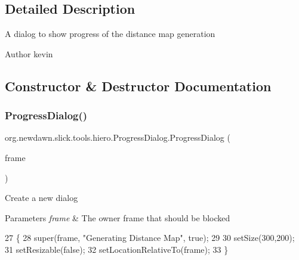\subsection{Detailed Description}
A dialog to show progress of the distance map generation

\begin{DoxyAuthor}{Author}
kevin 
\end{DoxyAuthor}


\subsection{Constructor \& Destructor Documentation}
\mbox{\label{classorg_1_1newdawn_1_1slick_1_1tools_1_1hiero_1_1_progress_dialog_a682daff052b72afb47eeb3daae24aaa6}} 
\subsubsection{\texorpdfstring{Progress\+Dialog()}{ProgressDialog()}}
{\footnotesize\ttfamily org.\+newdawn.\+slick.\+tools.\+hiero.\+Progress\+Dialog.\+Progress\+Dialog (\begin{DoxyParamCaption}\item[{J\+Frame}]{frame }\end{DoxyParamCaption})\hspace{0.3cm}{\ttfamily [inline]}}

Create a new dialog


\begin{DoxyParams}{Parameters}
{\em frame} & The owner frame that should be blocked \\
\hline
\end{DoxyParams}

\begin{DoxyCode}
27                                         \{
28         super(frame, \textcolor{stringliteral}{"Generating Distance Map"}, \textcolor{keyword}{true});
29     
30         setSize(300,200);
31         setResizable(\textcolor{keyword}{false});
32         setLocationRelativeTo(frame);
33     \}
\end{DoxyCode}


